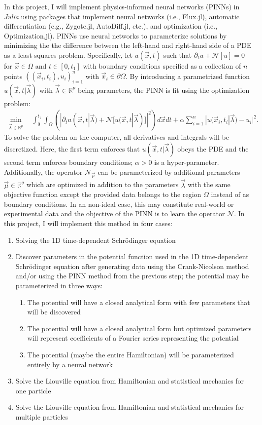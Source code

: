 \documentclass[10pt]{article}
\newcommand{\R}{\mathbb R}
\newcommand{\1}{\mathbf 1}
\begin{document}
In this project, I will implement physics-informed neural networks (PINNs) in {\em Julia} using packages that implement neural networks (i.e., Flux.jl), automatic differentiation (e.g., Zygote.jl, AutoDiff.jl, etc.), and optimization (i.e., Optimization,jl).
PINNs use neural networks to parameterize solutions by minimizing the the difference between the left-hand and right-hand side of a PDE as a least-squares problem.
Specifically, let $u(\vec x,t)$ such that $\partial_t u + \mathcal{N}[u] = 0$ for $\vec x \in \Omega$ and $t \in [0,t_1]$ with boundary conditions specified as a collection of $n$ points $((\vec x_i,t_i),u_i)_{i=1}^n$ with $\vec x_i \in \partial \Omega$.
By introducing a parametrized function $u(\vec x, t | \vec \lambda)$ with $\vec \lambda \in \R^p$ being parameters, the PINN is fit using the optimization problem:
\begin{align}
	\min_{\vec \lambda \in \R^p} \quad \int_0^{t_1} \int_\Omega\left( | \partial_t u(\vec x,t| \vec \lambda)  + \mathcal{N}[u(\vec x,t | \vec \lambda)]|^2 \right)d \vec x dt + \alpha \sum_{i=1}^n|u(\vec x_i,t_i | \vec \lambda) - u_i|^2.
\end{align}
To solve the problem on the computer, all derivatives and integrals will be discretized.
Here, the first term enforces that $u(\vec x,t| \vec \lambda)$ obeys the PDE and the second term enforces boundary conditions; $\alpha>0$ is a hyper-parameter.
Additionally, the operator $\mathcal{N}_{\vec \mu}$ can be parameterized by additional parameters $\vec \mu \in \R^q$ which are optimized in addition to the parameters $\vec \lambda$ with the same objective function except the provided data belongs to the region $\Omega$ instead of as boundary conditions.
In an non-ideal case, this may constitute real-world or experimental data and the objective of the PINN is to learn the operator $\mathcal{N}$.
In this project, I will implement this method in four cases:
\begin{enumerate}
	\item Solving the 1D time-dependent Schr\"odinger equation 
	\item Discover parameters in the potential function used in the 1D time-dependent Schr\"odinger equation after generating data using the Crank-Nicolson method and/or using the PINN method from the previous step; the potential may be parameterized in three ways:
	\begin{enumerate}
		\item The potential will have a closed analytical form with few parameters that will be discovered
		\item The potential will have a closed analytical form but optimized parameters will represent coefficients of a Fourier series representing the potential
		\item The potential (maybe the entire Hamiltonian) will be parameterized entirely by a neural network
	\end{enumerate}
	\item Solve the Liouville equation from Hamiltonian and statistical mechanics for one particle
	\item Solve the Liouville equation from Hamiltonian and statistical mechanics for multiple particles
\end{enumerate}
\end{document}
